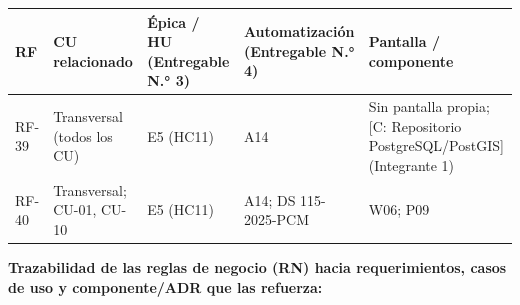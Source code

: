 \documentclass[11pt,a4paper]{article}
\begin{document}
{\small
\begin{longtable}[]{@{}
  >{\raggedright\arraybackslash}p{}
  >{\raggedright\arraybackslash}p{}
  >{\raggedright\arraybackslash}p{}
  >{\raggedright\arraybackslash}p{}
  >{\raggedright\arraybackslash}p{}@{}}
\toprule\noalign{}
\begin{minipage}[b]{\linewidth}\raggedright
RF
\end{minipage} & \begin{minipage}[b]{\linewidth}\raggedright
CU relacionado
\end{minipage} & \begin{minipage}[b]{\linewidth}\raggedright
Épica / HU (Entregable N.° 3)
\end{minipage} & \begin{minipage}[b]{\linewidth}\raggedright
Automatización (Entregable N.° 4)
\end{minipage} & \begin{minipage}[b]{\linewidth}\raggedright
Pantalla / componente
\end{minipage} \\
\midrule\noalign{}
\endhead
\bottomrule\noalign{}
\endlastfoot
RF-39 & Transversal (todos los CU) & E5 (HC11) & A14 & Sin pantalla propia; {[}C: Repositorio PostgreSQL/PostGIS{]} (Integrante 1) \\
RF-40 & Transversal; CU-01, CU-10 & E5 (HC11) & A14; DS 115-2025-PCM & W06; P09 \\
\end{longtable}
}

\textbf{Trazabilidad de las reglas de negocio (RN) hacia requerimientos, casos de uso y componente/ADR que las refuerza:}
\end{document}
